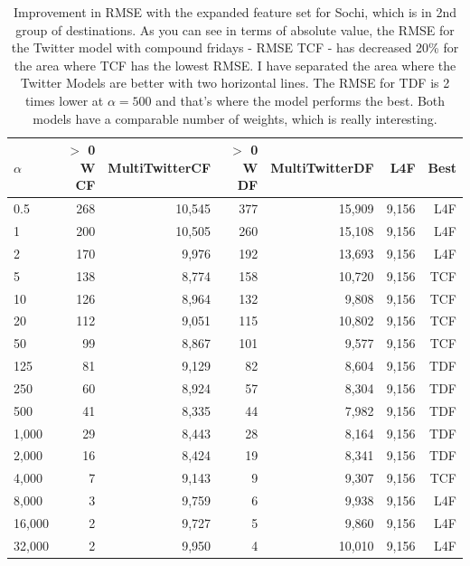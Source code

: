 \documentclass[minf,frontabs,twoside,singlespacing,parskip]{infthesis}
\begin{document}
\begin{table}[h!]
\begin{center}
\begin{tabular}{ l | r | r | r | r | r | r}
$\alpha$ & $>$ 0 W CF & MultiTwitterCF & $>$ 0 W DF & MultiTwitterDF & L4F & Best\\
\hline
0.5 & 268 & 10,545 & 377 & 15,909 & 9,156 & L4F\\
1 & 200 & 10,505 & 260 & 15,108 & 9,156 & L4F\\
2 & 170 & 9,976 & 192 & 13,693 & 9,156 & L4F\\
\hline
5 & 138 & 8,774 & 158 & 10,720 & 9,156 & TCF\\
10 & 126 & 8,964 & 132 & 9,808 & 9,156 & TCF\\
20 & 112 & 9,051 & 115 & 10,802 & 9,156 & TCF\\
50 & 99 & 8,867 & 101 & 9,577 & 9,156 & TCF\\
125 & 81 & 9,129 & 82 & 8,604 & 9,156 & TDF\\
250 & 60 & 8,924 & 57 & 8,304 & 9,156 & TDF\\
500 & 41 & 8,335 & 44 & 7,982 & 9,156 & TDF\\
1,000 & 29 & 8,443 & 28 & 8,164 & 9,156 & TDF\\
2,000 & 16 & 8,424 & 19 & 8,341 & 9,156 & TDF\\
4,000 & 7 & 9,143 & 9 & 9,307 & 9,156 & TCF\\
\hline
8,000 & 3 & 9,759 & 6 & 9,938 & 9,156 & L4F\\
16,000 & 2 & 9,727 & 5 & 9,860 & 9,156 & L4F\\
32,000 & 2 & 9,950 & 4 & 10,010 & 9,156 & L4F\\
\end{tabular}
\end{center}
\caption{Improvement in RMSE with the expanded feature set for Sochi, which is in 2nd group of destinations.  
As you can see in terms of absolute value, the RMSE for the Twitter model with compound fridays - RMSE TCF - has decreased 20\% for the area where TCF has the lowest RMSE. I have separated the area where the Twitter Models are better with two horizontal lines. The RMSE for TDF is 2 times lower at $\alpha=500$ and that's where the model performs the best. Both models have a comparable number of weights, which is really interesting.}
\label{table-sochi}
\end{table}
\end{document}
